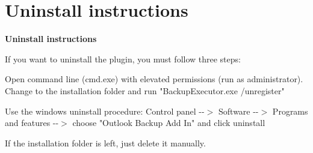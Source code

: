 \chapter{Uninstall instructions}
\hypertarget{md__c_1_2_users_2gg_2_documents_2_d_a_d_o_s_2_i_t_e_c-_p_r_o_j_e_c_t_s_2outlookbackupaddin_2docs_2_uninstall_01instructions}{}\label{md__c_1_2_users_2gg_2_documents_2_d_a_d_o_s_2_i_t_e_c-_p_r_o_j_e_c_t_s_2outlookbackupaddin_2docs_2_uninstall_01instructions}
{\bfseries{Uninstall instructions}}

If you want to uninstall the plugin, you must follow three steps\+:


\begin{DoxyItemize}
\item Open command line (cmd.\+exe) with elevated permissions (run as administrator). Change to the installation folder and run "{}\+Backup\+Executor.\+exe /unregister"{}
\item Use the windows uninstall procedure\+: Control panel -\/-\/\texorpdfstring{$>$}{>} Software -\/-\/\texorpdfstring{$>$}{>} Programs and features -\/-\/\texorpdfstring{$>$}{>} choose "{}\+Outlook Backup Add In"{} and click uninstall
\item If the installation folder is left, just delete it manually. 
\end{DoxyItemize}